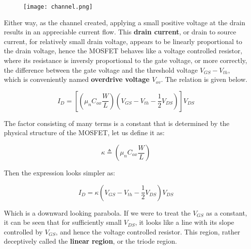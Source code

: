 \documentclass[../main.tex]{subfiles}
\begin{document}
    \begin{figure}[H]\centering
        \texttt{[image: channel.png]}
        \caption{}\label{fig:channel}
    \end{figure}

    Either way, as the channel created, applying a small positive voltage at the drain results in an appreciable current flow. 
    This \textbf{drain current}, or drain to source current, for relatively small drain voltage, appears to be linearly proportional to the 
    drain voltage, hence the MOSFET behaves like a voltage controlled resistor, where its resistance is inversly proportional 
    to the gate voltage, or more correctly, the difference between the gate voltage and the threshold voltage $V_{GS}-V_{th}$,
    which is conveniently named \textbf{overdrive voltage $V_{ov}$}. The relation is given below.

    \begin{equation}
        I_D = \left[\left(\mu_n C_{ox}\frac{W}{L}\right)\left(V_{GS}-V_{th}-\frac{1}{2}V_{DS}\right)\right]V_{DS}
    \end{equation}

    The factor consisting of many terms is a constant that is determined by the physical structure 
    of the MOSFET, let us define it as:

    \begin{equation}
        \kappa \triangleq \left(\mu_n C_{ox}\frac{W}{L}\right)
    \end{equation}

    \noindent Then the expression looks simpler as:

    \begin{equation}
        I_D = \kappa\left(V_{GS}-V_{th}-\frac{1}{2}V_{DS}\right)V_{DS}
    \end{equation}

    Which is a downward looking parabola. If we were to 
    treat the $V_{GS}$ as a constant, it can be seen that for sufficiently small $V_{DS}$, it looks like a line with 
    its slope controlled by $V_{GS}$, and hence the voltage controlled resistor. This region, rather deceptively called
    the \textbf{linear region}, or the triode region.
\end{document}
